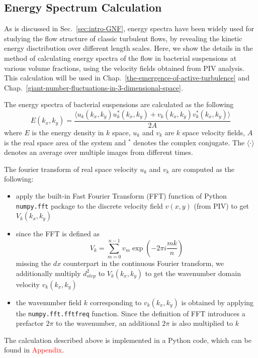\subsection{Energy Spectrum Calculation}
As is discussed in Sec.~\ref{sec:intro-GNF}, energy spectra have been widely used for studying the flow structure of classic turbulent flows, by revealing the kinetic energy disctribution over different length scales. Here, we show the details in the method of calculating energy spectra of the flow in bacterial suspensions at various volume fractions, using the velocity fields obtained from PIV analysis. This calculation will be used in Chap.~\ref{the-emergence-of-active-turbulence} and Chap.~\ref{giant-number-fluctuations-in-3-dimensional-space}.

The energy spectra of bacterial suspensions are calculated as the following
%
\begin{equation}
E(k_x, k_y) = \frac{\langle u_k(k_x, k_y)u^*_k(k_x, k_y)+v_k(k_x, k_y)v_k^*(k_x, k_y)\rangle}{2A}
\end{equation}
%
where $E$ is the energy density in $k$ space, $u_k$ and $v_k$ are $k$ space velocity fields, $A$ is the real space area of the system and $^*$ denotes the complex conjugate. The $\langle\cdot\rangle$ denotes an average over multiple images from different times.

The fourier transform of real space velocity $u_k$ and $v_k$ are computed as the following:
\begin{itemize}
  \item apply the built-in Fast Fourier Transform (FFT) function of Python \texttt{numpy.fft} package to the discrete velocity field $v(x, y)$ (from PIV) to get $V_k(k_x, k_y)$
  \item since the FFT is defined as
    $$
    V_k=\sum^{n-1}_{m=0}v_m\exp(-2\pi i \frac{mk}{n})
    $$
    missing the $dx$ counterpart in the continuous Fourier transform, we additionally multiply $d_{step}^2$ to $V_k(k_x, k_y)$ to get the wavenumber domain velocity $v_k(k_x, k_y)$
  \item the wavenumber field $k$ corresponding to $v_k(k_x, k_y)$ is obtained by applying the \texttt{numpy.fft.fftfreq} function. Since the definition of FFT introduces a prefactor $2\pi$ to the wavenumber, an additional $2\pi$ is also multiplied to $k$
\end{itemize}

The calculation described above is implemented in a Python code, which can be found in \textcolor{red}{Appendix}.

